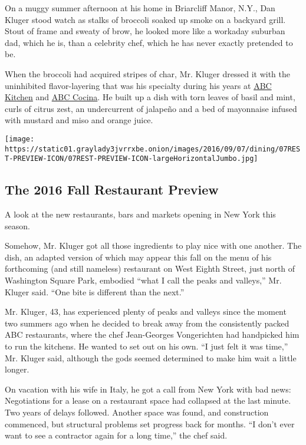 On a muggy summer afternoon at his home in Briarcliff Manor, N.Y., Dan
Kluger stood watch as stalks of broccoli soaked up smoke on a backyard
grill. Stout of frame and sweaty of brow, he looked more like a workaday
suburban dad, which he is, than a celebrity chef, which he has never
exactly pretended to be.

When the broccoli had acquired stripes of char, Mr. Kluger dressed it
with the uninhibited flavor-layering that was his specialty during his
years at
\href{http://www.nytimes3xbfgragh.onion/2010/06/02/dining/reviews/02rest.html}{ABC
Kitchen} and
\href{http://www.nytimes3xbfgragh.onion/2013/07/31/dining/reviews/restaurant-review-abc-cocina-in-manhattan.html}{ABC
Cocina}. He built up a dish with torn leaves of basil and mint, curls of
citrus zest, an undercurrent of jalapeño and a bed of mayonnaise infused
with mustard and miso and orange juice.

\href{https://www.nytimes3xbfgragh.onion/interactive/2016/09/07/dining/new-york-restaurants-fall-openings.html}{}

\texttt{[image: https://static01.graylady3jvrrxbe.onion/images/2016/09/07/dining/07REST-PREVIEW-ICON/07REST-PREVIEW-ICON-largeHorizontalJumbo.jpg]}

\hypertarget{the-2016-fall-restaurant-preview}{%
\subsection{The 2016 Fall Restaurant
Preview}\label{the-2016-fall-restaurant-preview}}

A look at the new restaurants, bars and markets opening in New York this
season.

Somehow, Mr. Kluger got all those ingredients to play nice with one
another. The dish, an adapted version of which may appear this fall on
the menu of his forthcoming (and still nameless) restaurant on West
Eighth Street, just north of Washington Square Park, embodied ``what I
call the peaks and valleys,'' Mr. Kluger said. ``One bite is different
than the next.''

Mr. Kluger, 43, has experienced plenty of peaks and valleys since the
moment two summers ago when he decided to break away from the
consistently packed ABC restaurants, where the chef Jean-Georges
Vongerichten had handpicked him to run the kitchens. He wanted to set
out on his own. ``I just felt it was time,'' Mr. Kluger said, although
the gods seemed determined to make him wait a little longer.

On vacation with his wife in Italy, he got a call from New York with bad
news: Negotiations for a lease on a restaurant space had collapsed at
the last minute. Two years of delays followed. Another space was found,
and construction commenced, but structural problems set progress back
for months. ``I don't ever want to see a contractor again for a long
time,'' the chef said.

